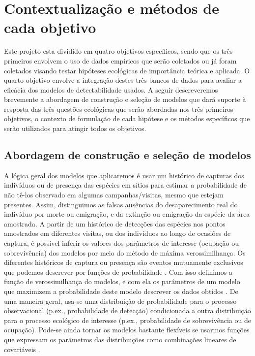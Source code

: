 \documentclass[12pt, A4]{article}
\begin{document}
\section{Contextualização e métodos de cada objetivo}
\label{sec:cont-e-metod}

Este projeto esta dividido em quatro objetivos específicos, sendo que
os três primeiros envolvem o uso de dados empíricos que serão
coletados ou já foram coletados visando testar hipóteses ecológicas de
importância teórica e aplicada. O quarto objetivo envolve a integração
destes três bancos de dados para avaliar a eficácia dos modelos de
detectabilidade usados. A seguir descreveremos brevemente a abordagem
de construção e seleção de modelos que dará suporte à resposta das
três questões ecológicas que serão abordadas nos três primeiros
objetivos, o contexto de formulação de cada hipótese e os métodos
específicos que serão utilizados para atingir todos os objetivos. 

\subsection{Abordagem de construção e seleção de modelos}
\label{sec:abord-de-constr}

A lógica geral dos modelos que aplicaremos é usar um histórico de capturas dos
indivíduos ou de presença das espécies em sítios para estimar a
probabilidade de não tê-los observado em algumas campanhas/visitas,
mesmo que estejam presentes. Assim, distinguimos as falsas ausências
do desaparecimento real do indivíduo por morte ou emigração, e da
extinção ou emigração da espécie da área amostrada. A partir de um
histórico de detecções das espécies nos pontos amostrados em
diferentes visitas, ou dos indivíduos ao longo de ocasiões de captura,
é possível inferir os valores dos parâmetros de interesse (ocupação ou
sobrevivência) dos modelos por meio do método de máxima
verossimilhança. Os diferentes históricos de captura ou presença são
eventos mutuamente exclusivos que podemos descrever por funções de
probabilidade \citep{lebreton1992,mackenzie2002}. Com
isso definimos a função de verossimilhança do modelos, e com ela os
parâmetros de um modelo que maximizem a probabilidade deste modelo
descrever os dados obtidos \citep{williams2002}. De uma maneira
geral, usa-se uma distribuição de probabilidade para o processo
observacional (p.ex., probabilidade de detecção) condicionada a outra
distribuição para o processo ecológico de interesse (p.ex.,
probabilidade de sobrevivência ou de ocupação). Pode-se ainda tornar
os modelos bastante flexíveis se usarmos funções que expressam os
parâmetros das distribuições como combinações lineares de covariáveis
\citep{mccullagh1989}.
\end{document}
